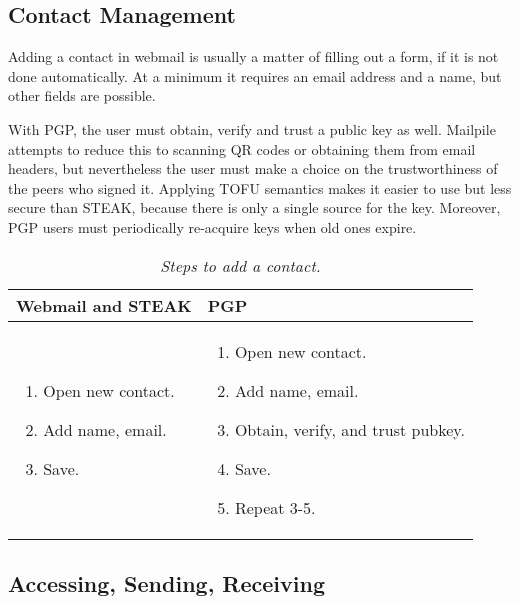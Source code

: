 \subsection{Contact Management}

Adding a contact in webmail is usually a matter of filling out a form, if it is not done automatically.  At a minimum it requires an email address and a name, but other fields are possible.

With PGP, the user must obtain, verify and trust a public key as well.  Mailpile attempts to reduce this to scanning QR codes or obtaining them from email headers, but nevertheless the user must make a choice on the trustworthiness of the peers who signed it.  Applying TOFU semantics makes it easier to use but less secure than STEAK, because there is only a single source for the key.  Moreover, PGP users must periodically re-acquire keys when old ones expire.

\begin{table}[ht!]
\begin{tabular}{ | L{3.5cm} | L{3.5cm} |}
\hline
\textbf{Webmail and STEAK} & \textbf{PGP} \\
\hline
\vspace{-3mm}
\begin{enumerate}
  \item{Open new contact.}
  \item{Add name, email.} 
  \item{Save.}
\end{enumerate} 
\vspace{-\topsep} &

\vspace{-3mm}
\begin{enumerate}
  \item{Open new contact.}
  \item{Add name, email.}
  \item{Obtain, verify, and trust pubkey.}
  \item{Save.}
  \item{Repeat 3-5.}
\end{enumerate} 
\vspace{-\topsep} \\

\hline
\end{tabular}
\caption{\it Steps to add a contact.}
\label{tab:account-creation}
\end{table}

\subsection{Accessing, Sending, Receiving}

